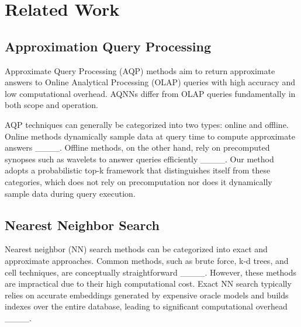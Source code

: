 \section{Related Work}
\label{sec:relwork}
\subsection{Approximation Query Processing}

Approximate Query Processing (AQP) methods aim to return approximate answers to Online Analytical Processing (OLAP) queries with high accuracy and low computational overhead. AQNNs differ from OLAP queries fundamentally in both scope and operation. 

AQP techniques can generally be categorized into two types: online and offline. Online methods dynamically sample data at query time to compute approximate answers ____. Offline methods, on the other hand, rely on precomputed synopses such as wavelets to answer queries efficiently ____. Our method adopts a probabilistic top-k framework that distinguishes itself from these categories, which does not rely on precomputation nor does it dynamically sample data during query execution. 

\subsection{Nearest Neighbor Search}
Nearest neighbor (NN) search methods can be categorized into exact and approximate approaches. Common methods, such as brute force, k-d trees, and cell techniques, are conceptually straightforward ____. However, these methods are impractical due to their high computational cost. Exact NN search typically relies on accurate embeddings generated by expensive oracle models and builds indexes over the entire database, leading to significant computational overhead ____. 

